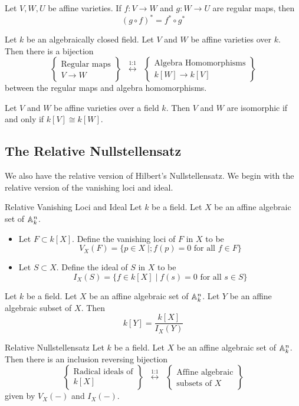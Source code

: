 \documentclass[a4paper]{article}
\begin{document}
\begin{lmm}{}{} Let $V,W,U$ be affine varieties. If $f:V\to W$ and $g:W\to U$ are regular maps, then $$(g\circ f)^\ast=f^\ast\circ g^\ast$$
\end{lmm}

\begin{prp}{}{} Let $k$ be an algebraically closed field. Let $V$ and $W$ be affine varieties over $k$. Then there is a bijection $$\left\{\substack{\text{Regular maps}\\ V\to W}\right\}\;\;\overset{\text{1:1}}{\longleftrightarrow}\;\;\left\{\substack{\text{Algebra Homomorphisms}\\ k[W]\to k[V]}\right\}$$ between the regular maps and algebra homomorphisms. 
\end{prp}

\begin{crl}{}{} Let $V$ and $W$ be affine varieties over a field $k$. Then $V$ and $W$ are isomorphic if and only if $k[V]\cong k[W]$. 
\end{crl}

\subsection{The Relative Nullstellensatz}
We also have the relative version of Hilbert's Nullstellensatz. We begin with the relative version of the vanishing loci and ideal. 

\begin{defn}{Relative Vanishing Loci and Ideal}{} Let $k$ be a field. Let $X$ be an affine algebraic set of $\mathbb{A}_k^n$. 
\begin{itemize}
\item Let $F\subset k[X]$. Define the vanishing loci of $F$ in $X$ to be $$V_X(F)=\{p\in X\;|;f(p)=0\text{ for all }f\in F\}$$
\item Let $S\subset X$. Define the ideal of $S$ in $X$ to be $$I_X(S)=\{f\in k[X]\;|\;f(s)=0\text{ for all }s\in S\}$$
\end{itemize}
\end{defn}

\begin{lmm}{}{} Let $k$ be a field. Let $X$ be an affine algebraic set of $\mathbb{A}_k^n$. Let $Y$ be an affine algebraic subset of $X$. Then $$k[Y]=\frac{k[X]}{I_X(Y)}$$
\end{lmm}

\begin{thm}{Relative Nullstellensatz}{} Let $k$ be a field. Let $X$ be an affine algebraic set of $\mathbb{A}_k^n$. Then there is an inclusion reversing bijection $$\left\{\substack{\text{Radical ideals of}\\ k[X]}\right\}\;\;\overset{\text{1:1}}{\longleftrightarrow}\;\;\left\{\substack{\text{Affine algebraic}\\\text{subsets of }X}\right\}$$ given by $V_X(-)$ and $I_X(-)$. 
\end{thm}
\end{document}
